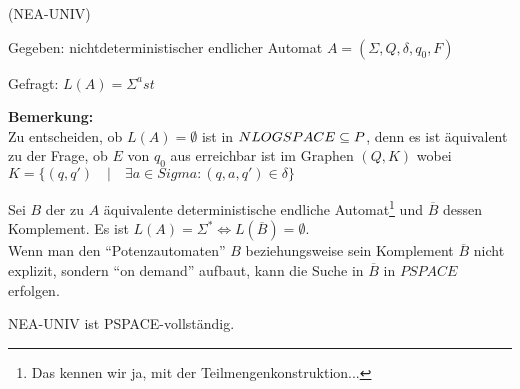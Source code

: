 \begin{definition}


     (NEA-UNIV)

    Gegeben: nichtdeterministischer endlicher Automat $A = (\Sigma, Q, \delta, q_0, F)$

    Gefragt: $L(A) = \Sigma^ast$

\end{definition}


\textbf{Bemerkung:}\\
Zu entscheiden, ob $L(A) = \emptyset$ ist in $NLOGSPACE \subseteq P$, denn es ist äquivalent zu der Frage, ob $E$ von $q_0$ aus erreichbar ist im Graphen $(Q,K)$ wobei
$K = \{ (q, q') \quad | \quad \exists a \in Sigma : (q, a, q') \in \delta \}$

Sei $B$ der zu $A$ äquivalente deterministische endliche Automat\footnote{Das kennen wir ja, mit der Teilmengenkonstruktion...} und $\overline{B}$ dessen Komplement. Es ist $L(A) = \Sigma^\ast \Longleftrightarrow L(\overline{B}) = \emptyset$.
\\
Wenn man den ``Potenzautomaten'' $B$ beziehungsweise sein Komplement $\overline{B}$ nicht explizit, sondern ``on demand'' aufbaut, kann die Suche in $\overline{B}$ in $PSPACE$ erfolgen.




\begin{satz}

    NEA-UNIV ist PSPACE-vollständig.

\end{satz}

